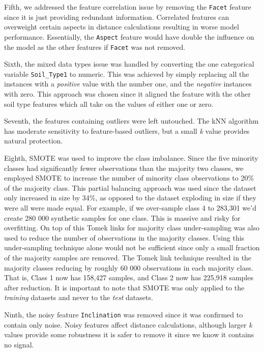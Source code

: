 \documentclass[10pt, conference]{IEEEtran}
\begin{document}
 Fifth, we addressed the feature correlation issue by removing the \texttt{Facet} feature since it is just providing redundant information. Correlated features can overweight certain aspects in distance calculations resulting in worse model performance. Essentially, the \texttt{Aspect} feature would have double the influence on the model as the other features if \texttt{Facet} was not removed.
 
 Sixth, the mixed data types issue was handled by converting the one categorical variable \texttt{Soil\_Type1} to numeric. This was achieved by simply replacing all the instances with a \textit{positive} value with the number one, and the \textit{negative} instances with zero. This approach was chosen since it aligned the feature with the other soil type features which all take on the values of either one or zero.
 
 Seventh, the features containing outliers were left untouched. The kNN algorithm has moderate sensitivity to feature-based outliers, but a small \textit{k} value provides natural protection.
 
 Eighth, SMOTE was used to improve the class imbalance. Since the five minority classes had significantly fewer observations than the majority two classes, we employed SMOTE to increase the number of minority class observations to 20\% of the majority class. This partial balancing approach was used since the dataset only increased in size by 34\%, as opposed to the dataset exploding in size if they were all were made equal. For example, if we over-sample class 4 to 283,301 we'd create 280 000 synthetic samples for one class. This is massive and risky for overfitting. On top of this Tomek links for majority class under-sampling was also used to reduce the number of observations in the majority classes. Using this under-sampling technique alone would not be sufficient since only a small fraction of the majority samples are removed. The Tomek link technique resulted in the majority classes reducing by roughly 60 000 observations in each majority class. That is, Class 1 now has 158,427 samples, and Class 2 now has 225,918 samples after reduction.  It is important to note that SMOTE was only applied to the \textit{training} datasets and never to the \textit{test} datasets.
 
 Ninth, the noisy feature \texttt{Inclination} was removed since it was confirmed to contain only noise. Noisy features affect distance calculations, although larger \textit{k} values provide some robustness it is safer to remove it since we know it contains no signal.
\end{document}

